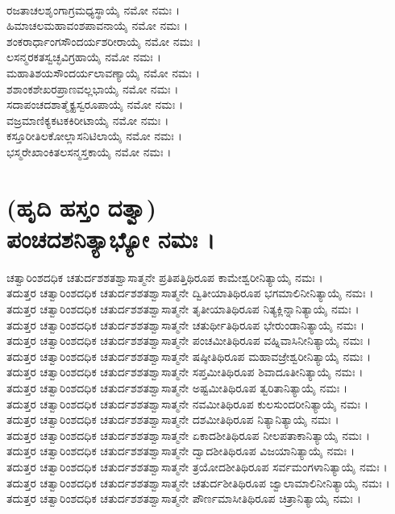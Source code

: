 \\
ರಜತಾಚಲಶೃಂಗಾಗ್ರಮಧ್ಯಸ್ಥಾಯೈ ನಮೋ ನಮಃ ।\\
ಹಿಮಾಚಲಮಹಾವಂಶಪಾವನಾಯೈ ನಮೋ ನಮಃ ।\\
ಶಂಕರಾರ್ಧಾಂಗಸೌಂದರ್ಯಶರೀರಾಯೈ ನಮೋ ನಮಃ ।\\
ಲಸನ್ಮರಕತಸ್ವಚ್ಛವಿಗ್ರಹಾಯೈ ನಮೋ ನಮಃ ।\\
ಮಹಾತಿಶಯಸೌಂದರ್ಯಲಾವಣ್ಯಾಯೈ ನಮೋ ನಮಃ ।\\
ಶಶಾಂಕಶೇಖರಪ್ರಾಣವಲ್ಲಭಾಯೈ ನಮೋ ನಮಃ ।\\
ಸದಾಪಂಚದಶಾತ್ಮೈಕ್ಯಸ್ವರೂಪಾಯೈ ನಮೋ ನಮಃ ।\\
ವಜ್ರಮಾಣಿಕ್ಯಕಟಕಕಿರೀಟಾಯೈ ನಮೋ ನಮಃ ।\\
ಕಸ್ತೂರೀತಿಲಕೋಲ್ಲಾಸನಿಟಿಲಾಯೈ ನಮೋ ನಮಃ ।\\
ಭಸ್ಮರೇಖಾಂಕಿತಲಸನ್ಮಸ್ತಕಾಯೈ ನಮೋ ನಮಃ ।

\section{(ಹೃದಿ ಹಸ್ತಂ ದತ್ವಾ)\\
ಪಂಚದಶನಿತ್ಯಾಭ್ಯೋ ನಮಃ ।}
ಚತ್ವಾರಿಂಶದಧಿಕ ಚತುರ್ದಶಶತಶ್ವಾಸಾತ್ಮನೇ ಪ್ರತಿಪತ್ತಿಥಿರೂಪ ಕಾಮೇಶ್ವರೀನಿತ್ಯಾಯೈ ನಮಃ ।\\
ತದುತ್ತರ ಚತ್ವಾರಿಂಶದಧಿಕ ಚತುರ್ದಶಶತಶ್ವಾಸಾತ್ಮನೇ ದ್ವಿತೀಯಾತಿಥಿರೂಪ ಭಗಮಾಲಿನೀನಿತ್ಯಾಯೈ ನಮಃ ।\\
ತದುತ್ತರ ಚತ್ವಾರಿಂಶದಧಿಕ ಚತುರ್ದಶಶತಶ್ವಾಸಾತ್ಮನೇ ತೃತೀಯಾತಿಥಿರೂಪ ನಿತ್ಯಕ್ಲಿನ್ನಾನಿತ್ಯಾಯೈ ನಮಃ ।\\
ತದುತ್ತರ ಚತ್ವಾರಿಂಶದಧಿಕ ಚತುರ್ದಶಶತಶ್ವಾಸಾತ್ಮನೇ ಚತುರ್ಥೀತಿಥಿರೂಪ ಭೇರುಂಡಾನಿತ್ಯಾಯೈ ನಮಃ ।\\
ತದುತ್ತರ ಚತ್ವಾರಿಂಶದಧಿಕ ಚತುರ್ದಶಶತಶ್ವಾಸಾತ್ಮನೇ ಪಂಚಮೀತಿಥಿರೂಪ ವಹ್ನಿವಾಸಿನೀನಿತ್ಯಾಯೈ ನಮಃ ।\\
ತದುತ್ತರ ಚತ್ವಾರಿಂಶದಧಿಕ ಚತುರ್ದಶಶತಶ್ವಾಸಾತ್ಮನೇ ಷಷ್ಠೀತಿಥಿರೂಪ ಮಹಾವಜ್ರೇಶ್ವರೀನಿತ್ಯಾಯೈ ನಮಃ ।\\
ತದುತ್ತರ ಚತ್ವಾರಿಂಶದಧಿಕ ಚತುರ್ದಶಶತಶ್ವಾಸಾತ್ಮನೇ ಸಪ್ತಮೀತಿಥಿರೂಪ ಶಿವಾದೂತೀನಿತ್ಯಾಯೈ ನಮಃ ।\\
ತದುತ್ತರ ಚತ್ವಾರಿಂಶದಧಿಕ ಚತುರ್ದಶಶತಶ್ವಾಸಾತ್ಮನೇ ಅಷ್ಟಮೀತಿಥಿರೂಪ ತ್ವರಿತಾನಿತ್ಯಾಯೈ ನಮಃ ।\\
ತದುತ್ತರ ಚತ್ವಾರಿಂಶದಧಿಕ ಚತುರ್ದಶಶತಶ್ವಾಸಾತ್ಮನೇ ನವಮೀತಿಥಿರೂಪ ಕುಲಸುಂದರೀನಿತ್ಯಾಯೈ ನಮಃ ।\\
ತದುತ್ತರ ಚತ್ವಾರಿಂಶದಧಿಕ ಚತುರ್ದಶಶತಶ್ವಾಸಾತ್ಮನೇ ದಶಮೀತಿಥಿರೂಪ ನಿತ್ಯಾನಿತ್ಯಾಯೈ ನಮಃ ।\\
ತದುತ್ತರ ಚತ್ವಾರಿಂಶದಧಿಕ ಚತುರ್ದಶಶತಶ್ವಾಸಾತ್ಮನೇ ಏಕಾದಶೀತಿಥಿರೂಪ ನೀಲಪತಾಕಾನಿತ್ಯಾಯೈ ನಮಃ ।\\
ತದುತ್ತರ ಚತ್ವಾರಿಂಶದಧಿಕ ಚತುರ್ದಶಶತಶ್ವಾಸಾತ್ಮನೇ ದ್ವಾದಶೀತಿಥಿರೂಪ ವಿಜಯಾನಿತ್ಯಾಯೈ ನಮಃ ।\\
ತದುತ್ತರ ಚತ್ವಾರಿಂಶದಧಿಕ ಚತುರ್ದಶಶತಶ್ವಾಸಾತ್ಮನೇ ತ್ರಯೋದಶೀತಿಥಿರೂಪ ಸರ್ವಮಂಗಳಾನಿತ್ಯಾಯೈ ನಮಃ ।\\
ತದುತ್ತರ ಚತ್ವಾರಿಂಶದಧಿಕ ಚತುರ್ದಶಶತಶ್ವಾಸಾತ್ಮನೇ ಚತುರ್ದಶೀತಿಥಿರೂಪ ಜ್ವಾಲಾಮಾಲಿನೀನಿತ್ಯಾಯೈ ನಮಃ ।\\
ತದುತ್ತರ ಚತ್ವಾರಿಂಶದಧಿಕ ಚತುರ್ದಶಶತಶ್ವಾಸಾತ್ಮನೇ ಪೌರ್ಣಮಾಸೀತಿಥಿರೂಪ ಚಿತ್ರಾನಿತ್ಯಾಯೈ ನಮಃ ।

